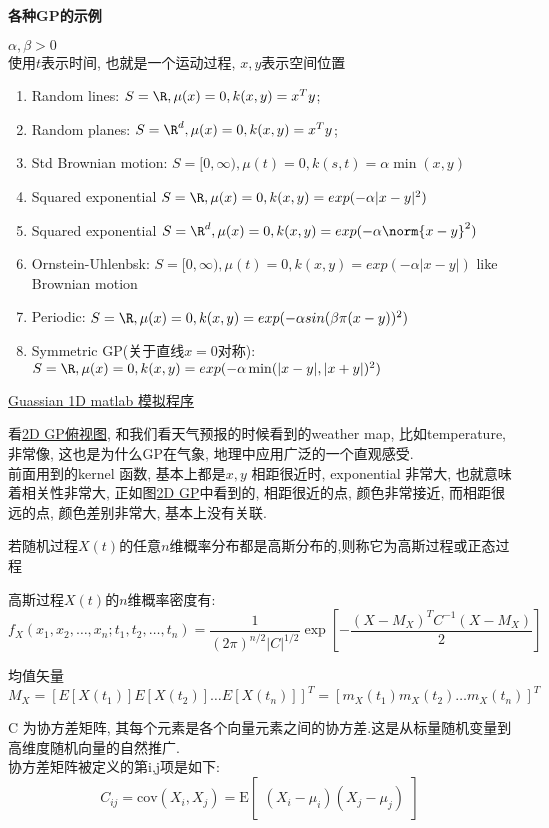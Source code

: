 \documentclass{article}
\begin{document}
\begin{example}
\textbf{各种GP的示例}

$\alpha, \beta > 0$\\
使用$t$表示时间, 也就是一个运动过程, $x,y$表示空间位置
\begin{enumerate}
\item  Random lines: $S=\R, \mu(x) = 0, k(x,y) = x^T y$; %
\item  Random planes: $S=\R^d, \mu(x) = 0, k(x,y) = x^T y$; %
\item  Std Brownian motion: $S=[0,\infty), \mu(t) = 0,  k(s,t) = \alpha \min(x,y)$
\item  Squared exponential $S = \R, \mu(x) = 0, k(x,y) = exp(- \alpha |x-y|^2)$ 
\item  Squared exponential $S = \R^d, \mu(x) = 0, k(x,y) = exp(- \alpha \norm{x-y}^2)$
\item  Ornstein-Uhlenbsk: $S=[0,\infty), \mu(t) = 0, k(x,y)  = exp(- \alpha |x-y|)$ like Brownian motion
\item  Periodic: $S = \R, \mu(x) = 0, k(x,y)  = exp(- \alpha sin(\beta \pi (x-y))^2)$ 
\item  Symmetric GP(关于直线$x=0$对称): $S =\R, \mu(x) = 0, k(x,y)  = exp(-\alpha \min(|x-y|, |x+y|)^2)$
\end{enumerate}
\href{../../demo/math/gaussian_1d.m}{Guassian 1D matlab 模拟程序}
\end{example}

看\href{http://i.imgbox.com/6XtDDnQs.png}{2D GP俯视图}, 和我们看天气预报的时候看到的weather map, 比如temperature, 非常像, 这也是为什么GP在气象, 地理中应用广泛的一个直观感受.\\
前面用到的kernel 函数, 基本上都是$x,y$ 相距很近时, exponential 非常大, 也就意味着相关性非常大, 
正如图\href{http://i.imgbox.com/1OsWR7cU.png}{2D GP}中看到的, 相距很近的点, 颜色非常接近, 而相距很远的点, 颜色差别非常大, 基本上没有关联.

若随机过程$X(t)$的任意$n$维概率分布都是高斯分布的,则称它为高斯过程或正态过程

高斯过程$X(t)$的$n$维概率密度有:
$$
f_X(x_1, x_2, \ldots, x_n; t_1, t_2, \ldots, t_n) = 
\frac{1}{(2\pi)^{n/2} |C|^{1/2}} \exp[- \frac{(X - M_X)^T C^{-1} (X - M_X)}{2}]
$$

均值矢量
$$ M_X = [E[X(t_1)] E[X(t_2)] \ldots E[X(t_n)]]^T = [m_X(t_1) m_X(t_2) \ldots m_X(t_n)]^T $$

C 为协方差矩阵, 其每个元素是各个向量元素之间的协方差.这是从标量随机变量到高维度随机向量的自然推广.\\
协方差矩阵被定义的第i,j项是如下:
$$ C_{ij} = \mathrm{cov}(X_i, X_j) = \mathrm{E}\begin{bmatrix} (X_i - \mu_i)(X_j - \mu_j) \end{bmatrix} $$
\end{document}
